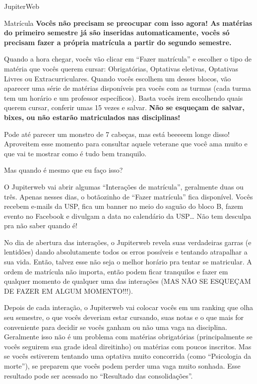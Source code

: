 \begin{secao}{JupiterWeb}
\begin{subsecao}{Matrícula}
\textbf{Vocês não precisam se preocupar com isso agora! As matérias do primeiro
semestre já são inseridas automaticamente, vocês só precisam fazer a própria
matrícula a partir do segundo semestre.}

Quando a hora chegar, vocês vão clicar em “Fazer matrícula” e escolher o tipo de
matéria que vocês querem cursar: Obrigatórias, Optativas eletivas, Optativas
Livres ou Extracurriculares. Quando vocês escolhem um desses blocos, vão
aparecer uma série de matérias disponíveis pra vocês com as turmas (cada turma
tem um horário e um professor específicos). Basta vocês irem escolhendo quais
querem cursar, conferir umas 15 vezes e salvar. \textbf{Não se esqueçam de salvar,
bixes, ou não estarão matriculados nas disciplinas!}

Pode até parecer um monstro de 7 cabeças, mas está beeeeem longe disso!
Aproveitem esse momento para consultar aquele veterane que você ama muito e que
vai te mostrar como é tudo bem tranquilo.

Mas quando é mesmo que eu faço isso?

O Jupiterweb vai abrir algumas “Interações de matrícula”, geralmente duas ou três.
Apenas nesses dias, o botãozinho de “Fazer matrícula” fica disponível. Vocês
recebem e-mails da USP, fica um banner no meio do saguão do bloco B, fazem
evento no Facebook e divulgam a data no calendário da USP… Não tem desculpa pra
não saber quando é!

No dia de abertura das interações, o Jupiterweb revela suas verdadeiras garras
(e lentidões) dando absolutamente todos os erros possíveis e tentando
atrapalhar a sua vida. Então, talvez esse não seja o melhor horário pra tentar
se matricular. A ordem de matrícula não importa, então podem ficar tranquilos e
fazer em qualquer momento de qualquer uma das interações (MAS NÃO SE ESQUEÇAM DE
FAZER EM ALGUM MOMENTO!!!).

Depois de cada interação, o Jupiterweb vai colocar vocês em um ranking que olha seu
semestre, o que vocês deveriam estar cursando, suas notas e o que mais for
conveniente para decidir se vocês ganham ou não uma vaga na disciplina.
Geralmente isso não é um problema com matérias obrigatórias (principalmente se
vocês seguirem sua grade ideal direitinho) ou matérias com poucos inscritos. Mas
se vocês estiverem tentando uma optativa muito concorrida (como ``Psicologia da
morte''), se preparem que vocês podem perder uma vaga muito sonhada.
Esse resultado pode ser acessado no ``Resultado das consolidações''.


\end{subsecao}
\end{secao}
